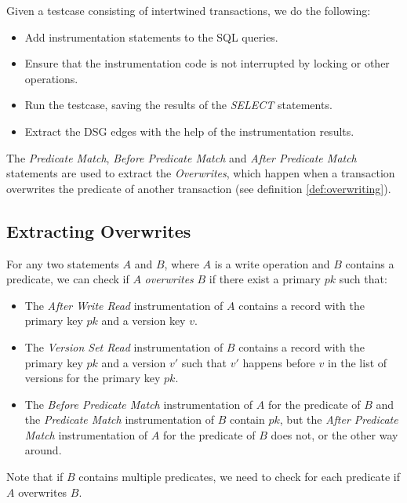 Given a testcase consisting of intertwined transactions, we do the following:

\begin{itemize}
    \item Add instrumentation statements to the SQL queries.
    \item Ensure that the instrumentation code is not interrupted by locking or other operations.
    \item Run the testcase, saving the results of the \textit{SELECT} statements.
    \item Extract the DSG edges with the help of the instrumentation results. 
\end{itemize}

The \textit{Predicate Match}, \textit{Before Predicate Match} and \textit{After Predicate Match} statements are used to extract the \textit{Overwrites}, which happen when a transaction overwrites the predicate of another transaction (see definition \ref{def:overwriting}).

\subsection{Extracting Overwrites}

For any two statements $A$ and $B$, where $A$ is a write operation and $B$ contains a predicate, we can check if $A$ \textit{overwrites} $B$ if there exist a primary $pk$ such that:
\begin{itemize}
    \item The \textit{After Write Read} instrumentation of $A$ contains a record with the primary key $pk$ and a version key $v$.
    \item The \textit{Version Set Read} instrumentation of $B$ contains a record with the primary key $pk$ and a version $v'$ such that $v'$ happens before $v$ in the list of versions for the primary key $pk$.
    \item The \textit{Before Predicate Match} instrumentation of $A$ for the predicate of $B$ and the \textit{Predicate Match} instrumentation of $B$ contain $pk$, but the \textit{After Predicate Match} instrumentation of $A$ for the predicate of $B$ does not, or the other way around.
\end{itemize}

Note that if $B$ contains multiple predicates, we need to check for each predicate if $A$ overwrites $B$.

